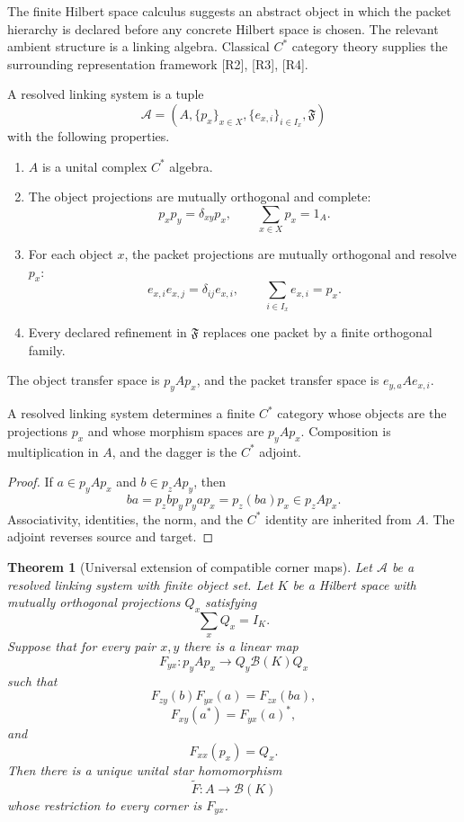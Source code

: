 \documentclass{aomart}
\newtheorem{theorem}{Theorem}[section]
\theoremstyle{definition}
\theoremstyle{remark}
\newcommand{\B}{\mathcal B}
\newcommand{\Acal}{\mathcal A}
\newcommand{\Rcite}[1]{\textup{[#1]}}
\begin{document}
The finite Hilbert space calculus suggests an abstract object in which the packet hierarchy is declared before any concrete Hilbert space is chosen. The relevant ambient structure is a linking algebra. Classical \(C^*\) category theory supplies the surrounding representation framework \Rcite{R2}, \Rcite{R3}, \Rcite{R4}.

\begin{definition}\label{def:resolved_linking_system}
A resolved linking system is a tuple
\[
 \Acal
 =
 \left(
 A,
 \{p_x\}_{x\in X},
 \{e_{x,i}\}_{i\in I_x},
 \mathfrak F
 \right)
\]
with the following properties.
\begin{enumerate}[label=\textup{(L\arabic*)}]
\item \(A\) is a unital complex \(C^*\) algebra.
\item The object projections are mutually orthogonal and complete:
\[
 p_xp_y=\delta_{xy}p_x,
 \qquad
 \sum_{x\in X}p_x=1_A.
\]
\item For each object \(x\), the packet projections are mutually orthogonal and resolve \(p_x\):
\[
 e_{x,i}e_{x,j}=\delta_{ij}e_{x,i},
 \qquad
 \sum_{i\in I_x}e_{x,i}=p_x.
\]
\item Every declared refinement in \(\mathfrak F\) replaces one packet by a finite orthogonal family.
\end{enumerate}
The object transfer space is \(p_yAp_x\), and the packet transfer space is \(e_{y,a}Ae_{x,i}\).
\end{definition}

\begin{proposition}\label{prop:corner_category}
A resolved linking system determines a finite \(C^*\) category whose objects are the projections \(p_x\) and whose morphism spaces are \(p_yAp_x\). Composition is multiplication in \(A\), and the dagger is the \(C^*\) adjoint.
\end{proposition}

\begin{proof}
If \(a\in p_yAp_x\) and \(b\in p_zAp_y\), then
\[
 ba=p_zbp_y\,p_yap_x=p_z(ba)p_x\in p_zAp_x.
\]
Associativity, identities, the norm, and the \(C^*\) identity are inherited from \(A\). The adjoint reverses source and target.
\end{proof}

\begin{theorem}[Universal extension of compatible corner maps]\label{thm:universal_corner_extension}
Let \(\Acal\) be a resolved linking system with finite object set. Let \(K\) be a Hilbert space with mutually orthogonal projections \(Q_x\) satisfying
\[
 \sum_xQ_x=I_K.
\]
Suppose that for every pair \(x,y\) there is a linear map
\[
 F_{yx}:p_yAp_x\longrightarrow Q_y\B(K)Q_x
\]
such that
\[
 F_{zy}(b)F_{yx}(a)=F_{zx}(ba),
\]
\[
 F_{xy}(a^*)=F_{yx}(a)^*,
\]
and
\[
 F_{xx}(p_x)=Q_x.
\]
Then there is a unique unital star homomorphism
\[
 \widetilde F:A\longrightarrow\B(K)
\]
whose restriction to every corner is \(F_{yx}\).
\end{theorem}
\end{document}
